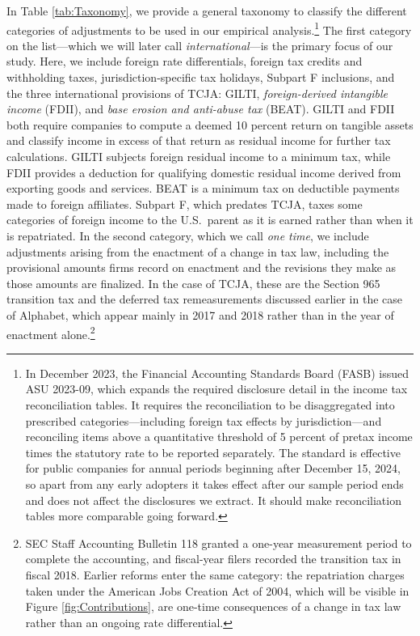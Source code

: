 \documentclass[11pt,letterpaper]{article}
\begin{document}
In Table \ref{tab:Taxonomy}, we provide a general taxonomy to classify
the different categories of adjustments to be used in our empirical
analysis.\footnote{%
In December 2023, the Financial Accounting Standards Board (FASB) issued
ASU 2023-09, which expands the required disclosure detail in the income tax
reconciliation tables. It requires the reconciliation to be disaggregated into
prescribed categories---including foreign tax effects by jurisdiction---and
reconciling items above a quantitative threshold of 5 percent of pretax income
times the statutory rate to be reported separately. The standard is effective
for public companies for annual periods beginning after December 15, 2024, so
apart from any early adopters it takes effect after our sample period ends and
does not affect the disclosures we extract. It should make reconciliation
tables more comparable going forward.}
The first category
on the list---which we will later call \emph{international}---is 
the primary focus
of our study. Here, we include foreign rate differentials, foreign
tax credits and withholding taxes, jurisdiction-specific tax holidays,
Subpart F inclusions, and the three international provisions of TCJA: GILTI, 
\emph{foreign-derived intangible income} (FDII), and 
\emph{base erosion and anti-abuse tax} (BEAT).
 GILTI and FDII both require companies to compute
a deemed 10 percent return on tangible assets and classify income in
excess of that return as residual income for further tax calculations.
GILTI subjects foreign residual income to a minimum tax, while FDII
provides a deduction for qualifying domestic residual income derived
from exporting goods and services. BEAT is a minimum tax on deductible
payments made to foreign affiliates. Subpart F, which predates TCJA, taxes some
categories of foreign income to the U.S.\ parent as it is earned
rather than when it is repatriated.
In the second category, which we 
call \emph{one time}, we include
adjustments arising from the enactment of a change in tax law,
including the provisional amounts firms record on enactment and the
revisions they make as those amounts are finalized. In the case of
TCJA, these are the Section 965 transition tax and the deferred tax
remeasurements discussed earlier in the case of Alphabet, which appear
mainly in 2017 and 2018 rather than in the year of enactment
alone.\footnote{%
SEC Staff Accounting Bulletin 118 granted a one-year measurement period
to complete the accounting, and fiscal-year filers recorded the
transition tax in fiscal 2018. Earlier reforms enter the same category:
the repatriation charges taken under the American Jobs Creation Act of
2004, which will be visible in Figure \ref{fig:Contributions}, are one-time
consequences of a change in tax law rather than an ongoing rate
differential.}
\end{document}
